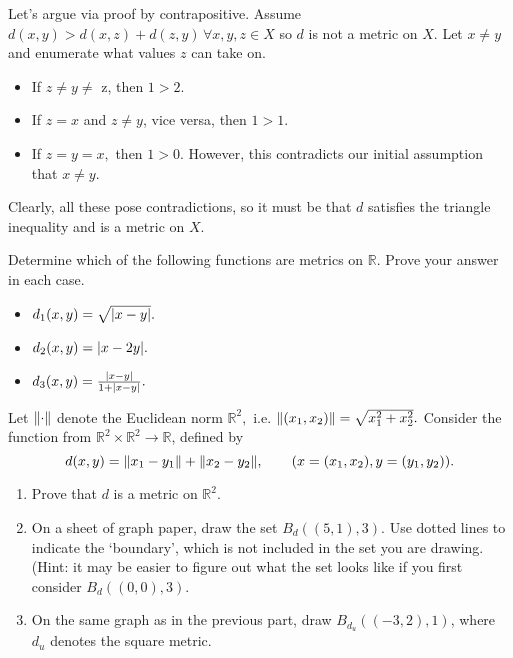 \documentclass[12pt,letterpaper,boxed]{hmcpset}
\DeclarePairedDelimiter\abs{\lvert}{\rvert}
\DeclarePairedDelimiter{\norm}{\lVert}{\rVert}
\begin{document}
\begin{solution}
Let's argue via proof by contrapositive. Assume $d(x, y) > d(x, z) + d(z, y) \, \forall x, y, z \in X$ so $d$ is not a metric on $X.$ Let $x \neq y$ and enumerate what values $z$ can take on. 
\vspace{-2mm}
\begin{itemize}
	\itemsep0em
	\item If $z \neq y \neq$ z, then $1 > 2.$
	\item If $z = x$ and $z \neq y$, vice versa, then $1 > 1.$
	\item If $z = y = x,$ then $1 > 0.$ However, this contradicts our initial assumption that $x \neq y.$
\end{itemize}
Clearly, all these pose contradictions, so it must be that $d$ satisfies the triangle inequality and is a metric on $X$.

\end{solution}

\begin{problem}[Exercise 2.4.]
Determine which of the following functions are metrics on $\mathbb{R}$. Prove your answer in each case.
\vspace{-2mm}
\begin{itemize}
	\itemsep0em
	\item $d_1(x,y)=\sqrt{\abs{x - y}}.$
	\item $d_2(x,y)=\abs{x - 2y}.$
	\item $d_3(x,y)=\frac{\abs{x - y}}{1 + \abs{x - y}}.$
\end{itemize}
\end{problem}
\begin{solution}

\end{solution}

\begin{problem}[Exercise 2.6.]
Let $\norm{\cdot}$ denote the Euclidean norm $\mathbb{R}^{2},$ i.e. $\norm{(x_1, x_2)} = \sqrt{x_1^{2} + x_2^{2}}.$ Consider the function from $\mathbb{R}^{2} \times \mathbb{R}^{2} \rightarrow \mathbb{R}$, defined by $$d(x, y) = \norm{x_1 - y_1} + \norm{x_2 - y_2}, \quad \quad (x = (x_1, x_2), y = (y_1, y_2)). $$
\vspace{-2mm}
\begin{enumerate}
	\itemsep0em
	\item Prove that $d$ is a metric on $\mathbb{R}^{2}.$
	\item On a sheet of graph paper, draw the set $B_{d}((5, 1), 3).$ Use dotted lines to indicate the ‘boundary’,
which is not included in the set you are drawing. (Hint: it may be easier to figure out what the
set looks like if you first consider $B_{d}((0, 0), 3).$
	\item On the same graph as in the previous part, draw $B_{d_{u}}((-3, 2),1)$, where $d_{u}$ denotes the square metric.
\end{enumerate}
\end{problem}
\begin{solution}

\end{solution}
\end{document}
